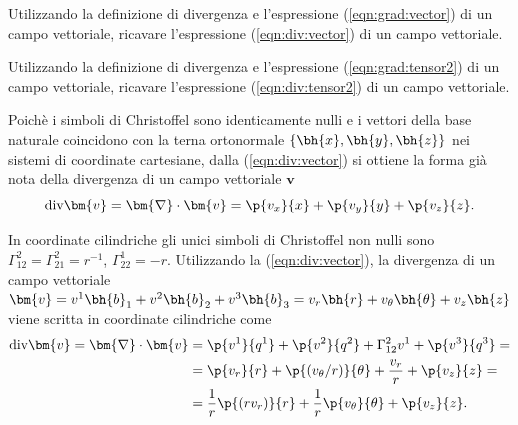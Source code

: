 \begin{exercise}
 Utilizzando la definizione di divergenza e l'espressione (\ref{eqn:grad:vector}) di un campo vettoriale, ricavare l'espressione (\ref{eqn:div:vector}) di un campo vettoriale.
\end{exercise}
\begin{exercise}
 Utilizzando la definizione di divergenza e l'espressione (\ref{eqn:grad:tensor2}) di un campo vettoriale, ricavare l'espressione (\ref{eqn:div:tensor2}) di un campo vettoriale.
\end{exercise}

\begin{example}
 Poichè i simboli di Christoffel sono identicamente nulli e i vettori della base naturale coincidono con la terna ortonormale $\{ \bh{x}, \bh{y}, \bh{z}\}$ nei sistemi di coordinate cartesiane, dalla (\ref{eqn:div:vector}) si ottiene la forma già nota della divergenza di un campo vettoriale $\bm{v}$ 
\begin{equation}
 \text{div} \bm{v} = \bm{\nabla} \cdot \bm{v} = \p{v_x}{x} + \p{v_y}{y} + \p{v_z}{z}.
\end{equation}
\end{example}
\begin{example}
In coordinate cilindriche gli unici simboli di Christoffel non nulli sono $\Gamma^2_{12} = \Gamma^2_{21} = r^{-1}$, $\Gamma^1_{22} = -r$. Utilizzando la (\ref{eqn:div:vector}), la divergenza di un campo vettoriale $\bm{v} = v^1 \bh{b}_1 + v^2 \bh{b}_2 + v^3 \bh{b}_3 = v_r \bh{r} + v_{\theta} \bh{\theta} + v_z \bh{z}$ viene scritta in coordinate cilindriche come
\begin{equation}
\begin{aligned}
 \text{div} \bm{v} = \bm{\nabla} \cdot \bm{v} & =
  \p{v^1}{q^1} + \p{v^2}{q^2} + \Gamma_{12}^2 v^1 + \p{v^3}{q^3} = \\
  & = \p{v_r}{r} + \p{ (v_{\theta}/r) }{\theta} + \dfrac{v_r}{r} + \p{v_z}{z} = \\	
  & = \dfrac{1}{r}\p{( r v_r)}{r} + \dfrac{1}{r}\p{v_{\theta}}{\theta} + \p{v_z}{z}.
\end{aligned}
\end{equation}
\end{example}

